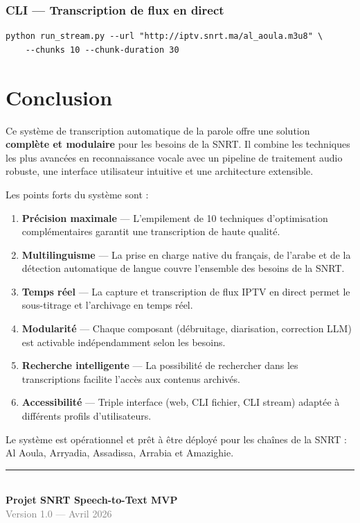 \documentclass[12pt,a4paper]{report}
\begin{document}
\subsection{CLI — Transcription de flux en direct}
\begin{lstlisting}[style=bash]
python run_stream.py --url "http://iptv.snrt.ma/al_aoula.m3u8" \
    --chunks 10 --chunk-duration 30
\end{lstlisting}

\chapter{Conclusion}

Ce système de transcription automatique de la parole offre une solution \textbf{complète et modulaire} pour les besoins de la SNRT. Il combine les techniques les plus avancées en reconnaissance vocale avec un pipeline de traitement audio robuste, une interface utilisateur intuitive et une architecture extensible.

\medskip

Les points forts du système sont :

\begin{enumerate}
    \item \textbf{Précision maximale} — L'empilement de 10 techniques d'optimisation complémentaires garantit une transcription de haute qualité.
    \item \textbf{Multilinguisme} — La prise en charge native du français, de l'arabe et de la détection automatique de langue couvre l'ensemble des besoins de la SNRT.
    \item \textbf{Temps réel} — La capture et transcription de flux IPTV en direct permet le sous-titrage et l'archivage en temps réel.
    \item \textbf{Modularité} — Chaque composant (débruitage, diarisation, correction LLM) est activable indépendamment selon les besoins.
    \item \textbf{Recherche intelligente} — La possibilité de rechercher dans les transcriptions facilite l'accès aux contenus archivés.
    \item \textbf{Accessibilité} — Triple interface (web, CLI fichier, CLI stream) adaptée à différents profils d'utilisateurs.
\end{enumerate}

\medskip

Le système est opérationnel et prêt à être déployé pour les chaînes de la SNRT : Al Aoula, Arryadia, Assadissa, Arrabia et Amazighie.

\vfill

\begin{center}
    \rule{0.5\textwidth}{0.4pt}\\[0.5em]
    {\large\textbf{Projet SNRT Speech-to-Text MVP}}\\
    {\textcolor{gray}{Version 1.0 — Avril 2026}}
\end{center}
\end{document}

